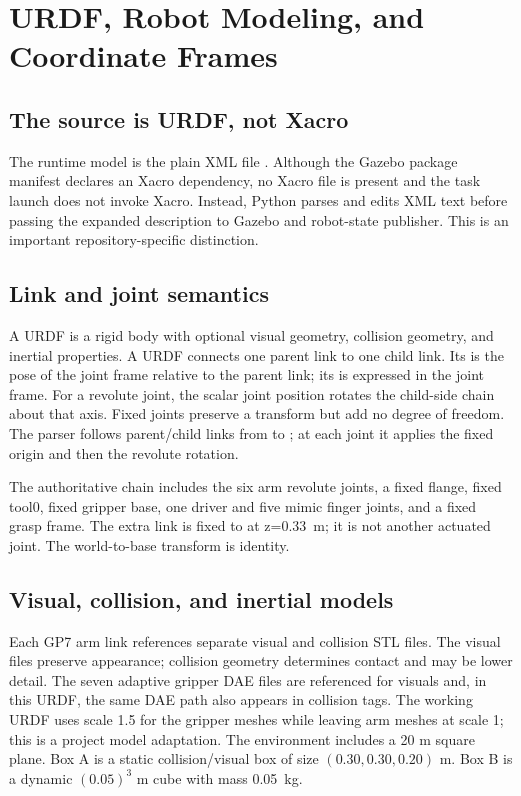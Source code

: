 \chapter{URDF, Robot Modeling, and Coordinate Frames}
\label{ch:urdf}

\section{The source is URDF, not Xacro}
The runtime model is the plain XML file
. Although the Gazebo package
manifest declares an Xacro dependency, no Xacro file is present and the task
launch does not invoke Xacro. Instead, Python parses and edits XML text before
passing the expanded description to Gazebo and robot-state publisher. This is
an important repository-specific distinction.

\section{Link and joint semantics}
A URDF  is a rigid body with optional visual geometry, collision
geometry, and inertial properties. A URDF  connects one parent
link to one child link. Its  is the pose of the joint frame
relative to the parent link; its  is expressed in the joint frame.
For a revolute joint, the scalar joint position rotates the child-side chain
about that axis. Fixed joints preserve a transform but add no degree of
freedom. The  parser follows parent/child links from
 to ; at each joint it applies the fixed
origin and then the revolute rotation.

The authoritative chain includes the six arm revolute joints, a fixed flange,
fixed tool0, fixed gripper base, one driver and five mimic finger joints, and a
fixed grasp frame. The extra  link is fixed to  at
z=\SI{0.33}{m}; it is not another actuated joint. The world-to-base transform
is identity.

\section{Visual, collision, and inertial models}
Each GP7 arm link references separate visual and collision STL files. The
visual files preserve appearance; collision geometry determines contact and
may be lower detail. The seven adaptive gripper DAE files are referenced for
visuals and, in this URDF, the same DAE path also appears in collision tags.
The working URDF uses scale 1.5 for the gripper meshes while leaving arm
meshes at scale 1; this is a project model adaptation. The environment includes
a 20 m square plane. Box A is a
static collision/visual box of size $(0.30,0.30,0.20)$ m. Box B is a dynamic
$(0.05)^3$ m cube with mass \SI{0.05}{kg}.

